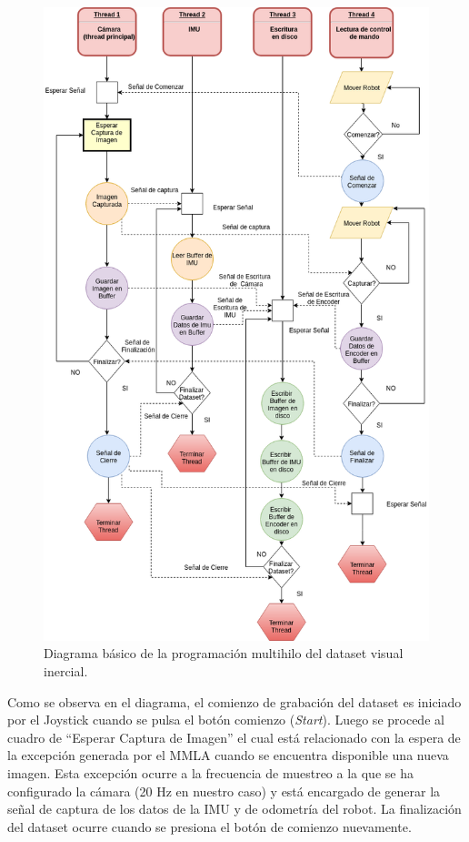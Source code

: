 \begin{figure}[H]
	\centering
	\includegraphics[width=1.0\linewidth]{imagenes/Implementacion/DiagramaMultithread}
	\caption{Diagrama básico de la programación multihilo del dataset visual inercial.}
	\label{imagen:diagramaMultithread}
\end{figure}

Como se observa en el diagrama, el comienzo de grabación del dataset es iniciado por el Joystick cuando se pulsa el botón comienzo (\textit{Start}). Luego se procede al cuadro de ``Esperar Captura de Imagen'' el cual está relacionado con la espera de la excepción generada por el MMLA cuando se encuentra disponible una nueva imagen. Esta excepción ocurre a la frecuencia de muestreo a la que se ha configurado la cámara (20 Hz en nuestro caso) y está encargado de generar la señal de captura de los datos de la IMU y de odometría del robot. La finalización del dataset ocurre cuando se presiona el botón de comienzo nuevamente.

